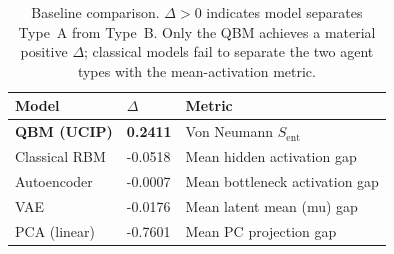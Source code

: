 \begin{table}[t]
\centering
\caption{Baseline comparison. $\Delta > 0$ indicates model separates Type~A from
Type~B. Only the QBM achieves a material positive $\Delta$; classical models fail to separate
the two agent types with the mean-activation metric.}
\label{tab:baselines}
\begin{tabular}{lll}
\toprule
Model & $\Delta$ & Metric \\
\midrule
\textbf{QBM (UCIP)} & \textbf{0.2411} & Von Neumann $S_\mathrm{ent}$ \\
Classical RBM & -0.0518 & Mean hidden activation gap \\
Autoencoder & -0.0007 & Mean bottleneck activation gap \\
VAE & -0.0176 & Mean latent mean (mu) gap \\
PCA (linear) & -0.7601 & Mean PC projection gap \\
\bottomrule
\end{tabular}
\end{table}
